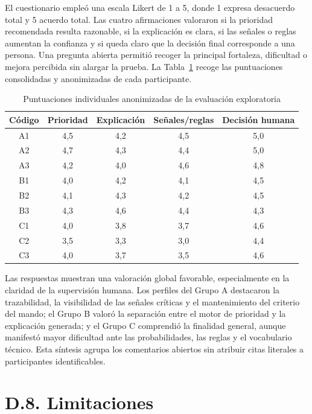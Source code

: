El cuestionario empleó una escala Likert de 1 a 5, donde 1 expresa desacuerdo total y
5 acuerdo total. Las cuatro afirmaciones valoraron si la prioridad recomendada resulta
razonable, si la explicación es clara, si las señales o reglas aumentan la confianza y si
queda claro que la decisión final corresponde a una persona. Una pregunta abierta permitió
recoger la principal fortaleza, dificultad o mejora percibida sin alargar la prueba. La
Tabla~\ref{tab:anexod-resultados-individuales} recoge las puntuaciones consolidadas y
anonimizadas de cada participante.

\begin{table}[H]
\centering
\caption{Puntuaciones individuales anonimizadas de la evaluación exploratoria}
\label{tab:anexod-resultados-individuales}
\scriptsize
\begin{tabular}{|c|c|c|c|c|}
\hline
\textbf{Código} & \textbf{Prioridad} & \textbf{Explicación} & \textbf{Señales/reglas} & \textbf{Decisión humana} \\ \hline
A1 & 4,5 & 4,2 & 4,5 & 5,0 \\ \hline
A2 & 4,7 & 4,3 & 4,4 & 5,0 \\ \hline
A3 & 4,2 & 4,0 & 4,6 & 4,8 \\ \hline
B1 & 4,0 & 4,2 & 4,1 & 4,5 \\ \hline
B2 & 4,1 & 4,3 & 4,2 & 4,5 \\ \hline
B3 & 4,3 & 4,6 & 4,4 & 4,3 \\ \hline
C1 & 4,0 & 3,8 & 3,7 & 4,6 \\ \hline
C2 & 3,5 & 3,3 & 3,0 & 4,4 \\ \hline
C3 & 4,0 & 3,7 & 3,5 & 4,6 \\ \hline
\end{tabular}
\end{table}

Las respuestas muestran una valoración global favorable, especialmente en la claridad
de la supervisión humana. Los perfiles del Grupo A destacaron la trazabilidad, la
visibilidad de las señales críticas y el mantenimiento del criterio del mando; el Grupo
B valoró la separación entre el motor de prioridad y la explicación generada; y el
Grupo C comprendió la finalidad general, aunque manifestó mayor dificultad ante las
probabilidades, las reglas y el vocabulario técnico. Esta síntesis agrupa los comentarios
abiertos sin atribuir citas literales a participantes identificables.

\section*{D.8. Limitaciones}

